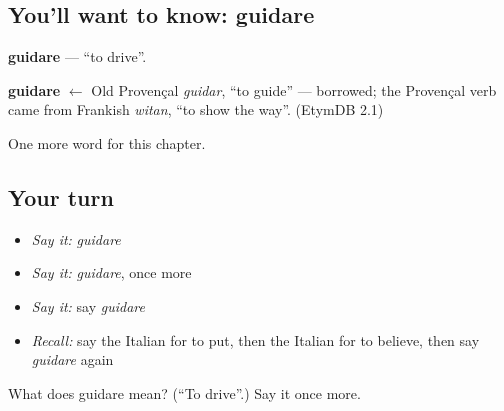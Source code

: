 \subsection*{You'll want to know: guidare}
\textbf{guidare} — \textquotedblleft{}to drive\textquotedblright{}.

\begin{cousinweb}
\textbf{guidare} $\leftarrow$ Old Provençal \emph{guidar}, \textquotedblleft{}to guide\textquotedblright{} — borrowed; the Provençal verb came from Frankish \emph{witan}, \textquotedblleft{}to show the way\textquotedblright{}. (EtymDB 2.1)
\end{cousinweb}

\begin{grammarlens}[title={What you've built}]
One more word for this chapter.
\end{grammarlens}

\subsection*{Your turn}
\begin{itemize}
\raggedright
  \item \emph{Say it:} \emph{guidare}
  \item \emph{Say it:} \emph{guidare}, once more
  \item \emph{Say it:} say \emph{guidare}
  \item \emph{Recall:} say the Italian for to put, then the Italian for to believe, then say \emph{guidare} again
\end{itemize}

\begin{tcolorbox}[breakable,colback=teal!4,colframe=teal!35!black,title={Before you move on}]
What does guidare mean? (\textquotedblleft{}To drive\textquotedblright{}.) Say it once more.
\end{tcolorbox}
